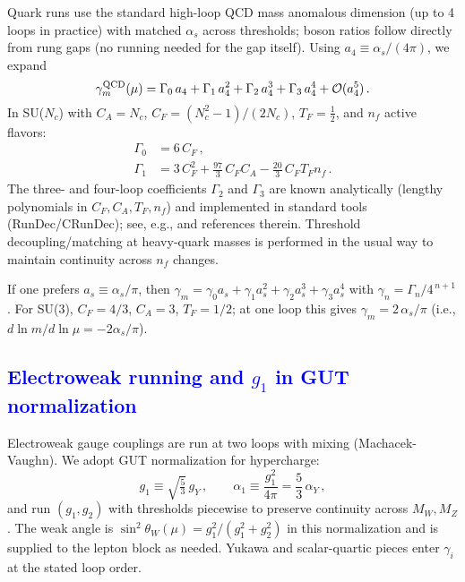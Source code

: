 \documentclass[%
amsmath,amssymb,
aps,
prb,
floatfix,showkeys
]{revtex4-2}
\newcommand{\modif}[1]{\textcolor{blue}{#1}}
\begin{document}
Quark runs use the standard high-loop QCD mass anomalous dimension (up to 4 loops in practice) with matched $\alpha_s$ across thresholds; boson ratios follow directly from rung gaps (no running needed for the gap itself). Using $a_4 \equiv \alpha_s/(4\pi)$, we expand
\begin{equation}
  \gamma_{m}^{\rm QCD}(\mu) = \Gamma_0\,a_4 + \Gamma_1\,a_4^{2} + \Gamma_2\,a_4^{3} + \Gamma_3\,a_4^{4} + \mathcal{O}(a_4^{5})\,.
  \label{eq:qcd_gamma_general}
\end{equation}
In SU($N_c$) with $C_A=N_c$, $C_F=(N_c^2-1)/(2N_c)$, $T_F=\tfrac{1}{2}$, and $n_f$ active flavors:
\begin{align}
  \Gamma_0 &= 6\,C_F\,,\label{eq:qcd_G0}\\
  \Gamma_1 &= 3\,C_F^2 + \frac{97}{3}\,C_F C_A - \frac{20}{3}\,C_F T_F n_f\,.\label{eq:qcd_G1}
\end{align}
The three- and four-loop coefficients $\Gamma_2$ and $\Gamma_3$ are known analytically (lengthy polynomials in $C_F,C_A,T_F,n_f$) and implemented in standard tools (RunDec/CRunDec); see, e.g., \cite{ChetyrkinKuehnSteinhauser2000,HerrenSteinhauser2018} and references therein. Threshold decoupling/matching at heavy-quark masses is performed in the usual way to maintain continuity across $n_f$ changes.

If one prefers $a_s\equiv\alpha_s/\pi$, then $\gamma_m = \gamma_0 a_s + \gamma_1 a_s^2 + \gamma_2 a_s^3 + \gamma_3 a_s^4$ with $\gamma_n=\Gamma_n/4^{\,n+1}$. For SU(3), $C_F=4/3$, $C_A=3$, $T_F=1/2$; at one loop this gives $\gamma_m=2\,\alpha_s/\pi$ (i.e., $d\ln m/d\ln\mu = -2\alpha_s/\pi$).

{\modif{\subsection{Electroweak running and $g_1$ in GUT normalization}
\label{subsec:ew_running}}}

Electroweak gauge couplings are run at two loops with mixing (Machacek-Vaughn). We adopt GUT normalization for hypercharge:
\begin{equation}
  g_1 \equiv \sqrt{\tfrac{5}{3}}\,g_Y\,,\qquad \alpha_1 \equiv \frac{g_1^2}{4\pi}=\frac{5}{3}\,\alpha_Y\,,
\end{equation}
and run $(g_1,g_2)$ with thresholds piecewise to preserve continuity across $M_W,M_Z$. The weak angle is $\sin^2\theta_W(\mu) = g_1^2/(g_1^2+g_2^2)$ in this normalization and is supplied to the lepton block as needed. Yukawa and scalar-quartic pieces enter $\gamma_i$ at the stated loop order.
\end{document}
